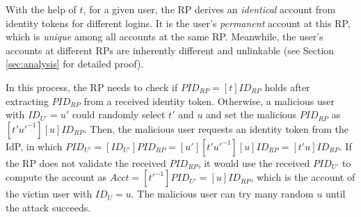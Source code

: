 %
%

With the help of $t$, for a given user, the RP derives an \emph{identical} account from identity tokens for different logins. It is the user's \emph{permanent} account at this RP, which is \emph{unique} among all accounts at the same RP. Meanwhile, the user's accounts at different RPs are inherently different and unlinkable (see Section \ref{sec:analysis} for detailed proof).

\newc
In this process, the RP needs to check if $PID_{RP} = [t]ID_{RP}$ holds after extracting $PID_{RP}$ from a received identity token. Otherwise, a malicious user with $ID_{U'} = u'$ could randomly select $t'$ and $u$ and set the malicious $PID_{RP}$ as $[t'u'^{-1}][u]ID_{RP}$. Then, the malicious user requests an identity token from the IdP, in which $PID_{U'} = [ID_{U'}]PID_{RP}=[u'][t'u'^{-1}][u]ID_{RP} = [t'u]ID_{RP}$. 
If the RP does not validate the received $PID_{RP}$, it would use the received $PID_{U'}$ to compute the account as $Acct = [t'^{-1}]PID_{U'}=[u]ID_{RP}$, which is the account of the victim user with $ID_{U} = u$. The malicious user can try many random $u$ until the attack succeeds.


